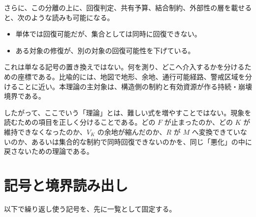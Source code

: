 \documentclass[12pt,a4paper]{article}
\begin{document}
さらに、この分離の上に、回復判定、共有予算、結合制約、外部性の層を載せると、次のような読みも可能になる。

\begin{itemize}
\tightlist
\item
  単体では回復可能だが、集合としては同時に回復できない。
\item
  ある対象の修復が、別の対象の回復可能性を下げている。
\end{itemize}

これは単なる記号の置き換えではない。何を測り、どこへ介入するかを分けるための座標である。比喩的には、地図で地形、余地、通行可能経路、警戒区域を分けることに近い。本理論の主対象は、構造側の制約と有効資源が作る持続・崩壊境界である。

したがって、ここでいう「理論」とは、難しい式を増やすことではない。現象を読むための項目を正しく分けることである。どの \(F\) が止まったのか、どの \(K\) が維持できなくなったのか、\(V_K\) の余地が縮んだのか、\(R\) が \(M\) へ変換できていないのか、あるいは集合的な制約で同時回復できないのかを、同じ「悪化」の中に戻さないための理論である。

\section{記号と境界読み出し}\label{ux8a18ux53f7ux3068ux5883ux754cux8aadux307fux51faux3057}

以下で繰り返し使う記号を、先に一覧として固定する。
\end{document}
